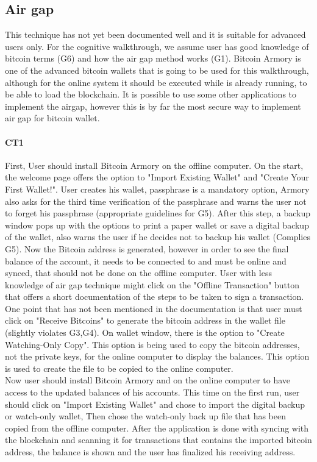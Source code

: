 
\subsection{Air gap}
\label{air gap}
This technique has not yet been documented well and it is suitable for advanced users only. For the cognitive walkthrough, we assume user has good knowledge of bitcoin terms (G6) and how the air gap method works (G1). Bitcoin Armory is one of the advanced bitcoin wallets that is going to be used for this walkthrough, although for the online system it should be executed while \bitcoinclient is already running, to be able to load the blockchain. It is possible to use some other applications to implement the airgap, however this is by far the most secure way to implement air gap for bitcoin wallet.

\paragraph{CT1} 
First, User should install Bitcoin Armory on the offline computer. On the start, the welcome page offers the option to "Import Existing Wallet" and "Create Your First Wallet!". User creates his wallet, passphrase is a mandatory option, Armory also asks for the third time verification of the passphrase and warns the user not to forget his passphrase (appropriate guidelines for G5). After this step, a backup window pops up with the options to print a paper wallet or save a digital backup of the wallet, also warns the user if he decides not to backup his wallet (Complies G5). Now the Bitcoin address is generated, however in order to see the final balance of the account, it needs to be connected to \bitcoinclient and \bitcoinclient must be online and synced, that should not be done on the offline computer. User with less knowledge of air gap technique might click on the "Offline Transaction" button that offers a short documentation of the steps to be taken to sign a transaction. One point that has not been mentioned in the documentation is that user must click on "Receive Bitcoins" to generate the bitcoin address in the wallet file (slightly violates G3,G4). On wallet window, there is the option to "Create Watching-Only Copy". This option is being used to copy the bitcoin addresses, not the private keys, for the online computer to display the balances. This option is used to create the file to be copied to the online computer.\\
Now user should install Bitcoin Armory and \bitcoinclient on the online computer to have access to the updated balances of his accounts. This time on the first run, user should click on "Import Existing Wallet" and chose to import the digital backup or watch-only wallet, Then chose the watch-only back up file that has been copied from the offline computer. After the application is done with syncing with the blockchain and scanning it for transactions that contains the imported bitcoin address, the balance is shown and the user has finalized his receiving address.


